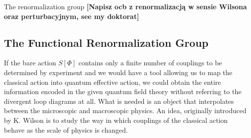 \documentclass[11pt, a4paper]{article}
\newcommand{\jhk}[1]{{\color{red}#1}}
\newcommand{\jhkbf}[1]{\textbf{\color{red} [#1]}}
\begin{document}






\jhk{The renormalization group}
\jhkbf{Napisz ocb z renormalizacją w sensie Wilsona oraz perturbacyjnym, see my doktorat}
\subsection{The Functional Renormalization Group}
If the bare action $S[\Phi]$ contains only a finite number of couplings to be determined by experiment and
we would have a tool allowing us to map the classical action into quantum effective action, we could obtain the
entire information encoded in the given quantum field theory without referring to the divergent loop
diagrams at all. What is needed is an object that interpolates between the microscopic and macroscopic
physics.
An idea, originally introduced by K. Wilson is to study the way in which couplings of the classical action behave as the scale of physics is changed.
\end{document}
